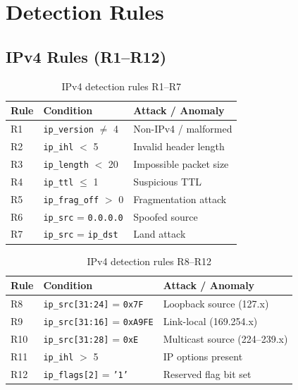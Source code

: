 \section{Detection Rules}

\subsection{IPv4 Rules (R1--R12)}

\begin{table}[H]
	\centering
	\caption{IPv4 detection rules R1--R7}
	\begin{tabular}{lll}
		\toprule
		\textbf{Rule} & \textbf{Condition} & \textbf{Attack / Anomaly} \\
		\midrule
		R1 & \texttt{ip\_version} $\neq$ 4        & Non-IPv4 / malformed      \\
		R2 & \texttt{ip\_ihl} $<$ 5               & Invalid header length     \\
		R3 & \texttt{ip\_length} $<$ 20            & Impossible packet size    \\
		R4 & \texttt{ip\_ttl} $\leq$ 1            & Suspicious TTL            \\
		R5 & \texttt{ip\_frag\_off} $>$ 0         & Fragmentation attack      \\
		R6 & \texttt{ip\_src} = \texttt{0.0.0.0} & Spoofed source            \\
		R7 & \texttt{ip\_src} = \texttt{ip\_dst} & Land attack               \\
		\bottomrule
	\end{tabular}
	\label{tab:r1r7}
\end{table}

\begin{table}[H]
	\centering
	\caption{IPv4 detection rules R8--R12}
	\begin{tabular}{lll}
		\toprule
		\textbf{Rule} & \textbf{Condition} & \textbf{Attack / Anomaly} \\
		\midrule
		R8  & \texttt{ip\_src[31:24]} = \texttt{0x7F}   & Loopback source (127.x)       \\
		R9  & \texttt{ip\_src[31:16]} = \texttt{0xA9FE} & Link-local (169.254.x)        \\
		R10 & \texttt{ip\_src[31:28]} = \texttt{0xE}    & Multicast source (224--239.x) \\
		R11 & \texttt{ip\_ihl} $>$ 5                    & IP options present            \\
		R12 & \texttt{ip\_flags[2]} = \texttt{'1'}      & Reserved flag bit set         \\
		\bottomrule
	\end{tabular}
	\label{tab:r8r12}
\end{table}

